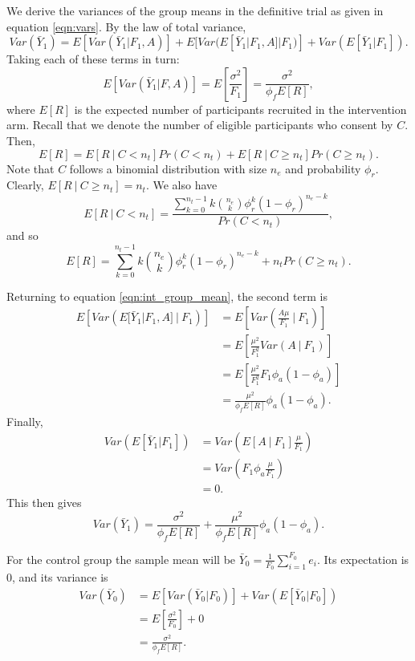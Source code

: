 \documentclass[AMA,STIX1COL]{WileyNJD-v2}
\begin{document}
\appendix

We derive the variances of the group means in the definitive trial as given in equation \ref{eqn:vars}. By the law of total variance,
\begin{equation}\label{eqn:int_group_mean}
Var(\bar{Y}_1) = E[Var(\bar{Y}_1 | F_1, A)] + 
E[Var(E[\bar{Y}_1 | F_1, A] | F_1)] + 
Var(E[\bar{Y}_1 | F_1]).
\end{equation}
Taking each of these terms in turn:
$$
E[Var(\bar{Y}_1 | F, A)] = E \left[ \frac{\sigma^2}{F_1} \right] = \frac{\sigma^2}{\phi_f E[R]},
$$
where $E[R]$ is the expected number of participants recruited in the intervention arm. Recall that we denote the number of eligible participants who consent by $C$. Then,
$$
E[R] = E[R ~|~ C < n_t] Pr(C < n_t) + E[R ~|~ C \geq n_t] Pr(C \geq n_t).
$$
Note that $C$ follows a binomial distribution with size $n_e$ and probability $\phi_r$. Clearly, $E[R ~|~ C \geq n_t] = n_t$. We also have
$$
E[R ~|~ C < n_t] = \frac{\sum_{k=0}^{n_t-1} k{n_e \choose k} \phi_r^k (1-\phi_r)^{n_e - k} } {Pr(C < n_t)},
$$
and so 
$$
E[R] = \sum_{k=0}^{n_t-1} k{n_e \choose k} \phi_r^k (1-\phi_r)^{n_e - k} + n_t Pr(C \geq n_t).
$$

Returning to equation \ref{eqn:int_group_mean}, the second term is 
\begin{align*}
E \left[ Var(E[\bar{Y}_1 | F_1, A] ~|~ F_1) \right] &= E \left[ Var \left(\frac{A\mu}{F_1} ~|~ F_1 \right) \right] \\
&= E \left[\frac{\mu^2}{F_1^2} Var(A ~|~ F_1) \right] \\
&= E \left[ \frac{\mu^2}{F_1^2} F_1 \phi_a (1-\phi_a) \right] \\
&= \frac{\mu^2}{\phi_f E[R]} \phi_a (1-\phi_a).
\end{align*}
Finally,
\begin{align*}
Var(E[\bar{Y}_1 | F_1]) &= Var \left( E \left[ A ~|~ F_1 \right] \frac{\mu}{F_1} \right) \\
&= Var \left( F_1 \phi_a \frac{\mu}{F_1} \right) \\
&= 0.
\end{align*}
This then gives
$$
Var(\bar{Y}_1) = \frac{\sigma^2}{\phi_f E[R]} + \frac{\mu^2}{\phi_f E[R]} \phi_a (1-\phi_a).
$$

For the control group the sample mean will be $\bar{Y}_0 = \frac{1}{F_0}\sum_{i=1}^{F_0} e_i$. Its expectation is 0, and its variance is
\begin{align*}
Var(\bar{Y}_0) &= E[Var(\bar{Y}_0 | F_0)] + Var(E[\bar{Y}_0 | F_0]) \\
&= E \left[ \frac{\sigma^2}{F_0} \right] + 0\\
&= \frac{\sigma^2}{\phi_f E[R]}.
\end{align*}
\end{document}
